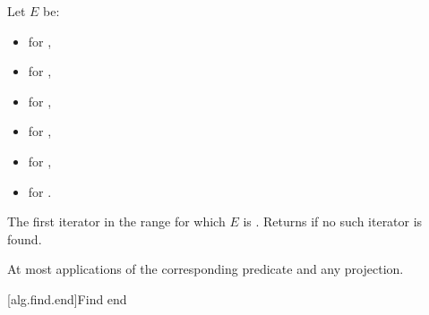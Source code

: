 \begin{itemdescr}
\pnum
Let $E$ be:
\begin{itemize}
\item {} for ,
\item {} for ,
\item {} for ,
\item {} for ,
\item {} for ,
\item {} for .
\end{itemize}

\pnum
\returns
The first iterator  in the range 
for which $E$ is .
Returns  if no such iterator is found.

\pnum
\complexity
At most  applications
of the corresponding predicate and any projection.
\end{itemdescr}

[alg.find.end]{Find end}

